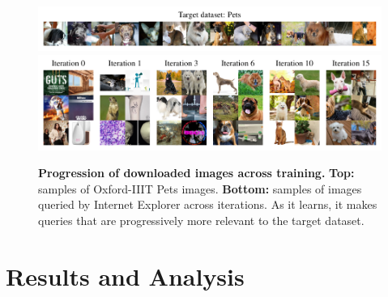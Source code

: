 
\begin{figure}[t]
    \centering
    \includegraphics[width=\linewidth]{figures/pets_targets.pdf}\\
    \vspace{-0.1in}
    \includegraphics[width=\linewidth]{figures/pets-progression-962-2col-3row.pdf}
    \vspace{-0.28in}
    \caption{
    \textbf{Progression of downloaded images across training.} \textbf{Top:} samples of Oxford-IIIT Pets images. \textbf{Bottom:} samples of images queried by Internet Explorer across iterations. As it learns, it makes queries that are progressively more relevant to the target dataset.
    }
    \label{fig:progression}
    \vspace{-0.15in}
\end{figure}

\section{Results and Analysis}
